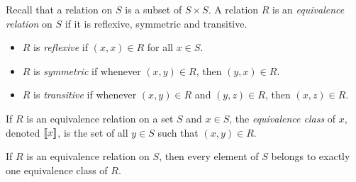 \documentclass[../generics]{subfiles}
\begin{document}
\begin{definition}
Recall that a relation on $S$ is a subset of $S\times S$. A relation $R$ is an \emph{equivalence relation} on $S$ if it is reflexive, symmetric and transitive.
\begin{itemize}
\item $R$ is \emph{reflexive} if $(x,x)\in R$ for all $x\in S$.
\item $R$ is \emph{symmetric} if whenever $(x,y)\in R$, then $(y,x)\in R$.
\item $R$ is \emph{transitive} if whenever $(x,y)\in R$ and $(y,z)\in R$, then $(x,z)\in R$.
\end{itemize}
If $R$ is an equivalence relation on a set $S$ and $x\in S$, the \emph{equivalence class} of $x$, denoted $[\![x]\!]$, is the set of all $y\in S$ such that $(x, y)\in R$.
\end{definition}
\begin{proposition}
If $R$ is an equivalence relation on $S$, then every element of $S$ belongs to exactly one equivalence class of $R$.
\end{proposition}
\end{document}

